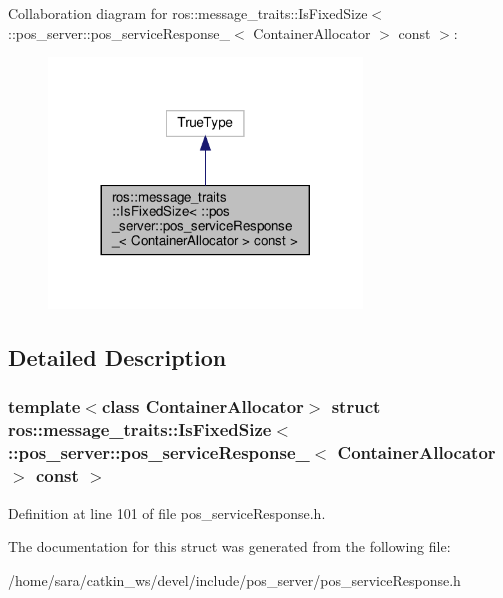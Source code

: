 Collaboration diagram for ros\+:\+:message\+\_\+traits\+:\+:Is\+Fixed\+Size$<$ \+:\+:pos\+\_\+server\+:\+:pos\+\_\+service\+Response\+\_\+$<$ Container\+Allocator $>$ const $>$\+:
\nopagebreak
\begin{figure}[H]
\begin{center}
\leavevmode
\includegraphics[width=236pt]{structros_1_1message__traits_1_1IsFixedSize_3_01_1_1pos__server_1_1pos__serviceResponse___3_01Co1997a3903c12e7868deef769fbaebd4f}
\end{center}
\end{figure}


\subsection{Detailed Description}
\subsubsection*{template$<$class Container\+Allocator$>$\newline
struct ros\+::message\+\_\+traits\+::\+Is\+Fixed\+Size$<$ \+::pos\+\_\+server\+::pos\+\_\+service\+Response\+\_\+$<$ Container\+Allocator $>$ const $>$}



Definition at line 101 of file pos\+\_\+service\+Response.\+h.



The documentation for this struct was generated from the following file\+:\begin{DoxyCompactItemize}
\item 
/home/sara/catkin\+\_\+ws/devel/include/pos\+\_\+server/pos\+\_\+service\+Response.\+h\end{DoxyCompactItemize}
